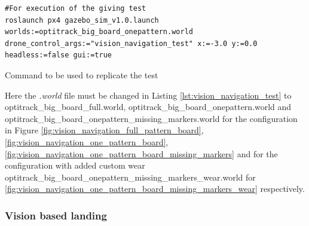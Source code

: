 \documentclass[../Head/report.tex]{subfiles}
\begin{document}
\begin{listing}[H] 
\begin{tcolorbox}[
    enhanced,
    attach boxed title to top left={xshift=6mm,yshift=-3mm},
    colback=lightgreen!20,
    colframe=lightgreen,
    fonttitle=\bfseries\color{black},
]
\begin{verbatim}
#For execution of the giving test
roslaunch px4 gazebo_sim_v1.0.launch worlds:=optitrack_big_board_onepattern.world drone_control_args:="vision_navigation_test" x:=-3.0 y:=0.0 headless:=false gui:=true
\end{verbatim}
\end{tcolorbox}
\caption{Command to be used to replicate the test}
\label{lst:vision_navigation_test}    
\end{listing} 

Here the \textit{.world} file must be changed in Listing \ref{lst:vision_navigation_test} to optitrack\_big\_board\_full.world, optitrack\_big\_board\_onepattern.world and optitrack\_big\_board\_onepattern\_missing\_markers.world for the configuration in Figure \ref{fig:vision_navigation_full_pattern_board}, \ref{fig:vision_navigation_one_pattern_board}, \ref{fig:vision_navigation_one_pattern_board_missing_markers} and for the configuration with added custom wear optitrack\_big\_board\_onepattern\_missing\_markers\_wear.world  for  \ref{fig:vision_navigation_one_pattern_board_missing_markers_wear} respectively. 

\subsubsection{Vision based landing}
\label{sec:vision_based_landing}
\end{document}
